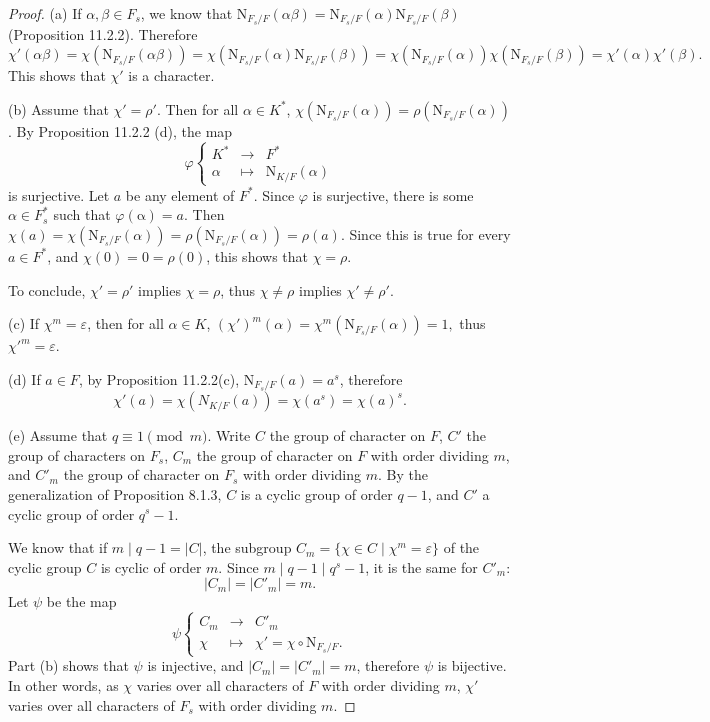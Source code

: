 \documentclass[11pt,a4paper]{article}
\begin{document}
\begin{proof}
\item[(a)] If $\alpha,\beta \in F_s$, we know that $\mathrm{N}_{F_s/F}(\alpha \beta) = \mathrm{N}_{F_s/F}(\alpha) \mathrm{N}_{F_s/F}(\beta)$ (Proposition 11.2.2). Therefore
$$\chi'(\alpha \beta) =\chi(\mathrm{N}_{F_s/F}(\alpha \beta)) =  \chi(\mathrm{N}_{F_s/F}(\alpha) \mathrm{N}_{F_s/F}(\beta)) = \chi(\mathrm{N}_{F_s/F}(\alpha))\chi(\mathrm{N}_{F_s/F}(\beta)) = \chi'(\alpha) \chi'(\beta).$$
This shows that $\chi'$ is a character.

\item[(b)] Assume that $\chi' = \rho'$. Then for all $\alpha \in K^*$, $\chi(\mathrm{N}_{F_s/F}(\alpha)) =\rho(\mathrm{N}_{F_s/F}(\alpha))$.
By Proposition 11.2.2 (d), the map
$$\varphi
\left\{
\begin{array}{ccl}
K^* & \to & F^*\\
\alpha & \mapsto & \mathrm{N}_{K/F}(\alpha)
\end{array}
\right.
$$
is surjective. Let $a$ be any element of $F^*$. Since $\varphi$ is surjective, there is some $\alpha \in F_s^*$ such that $\varphi (\mathrm{\alpha}) = a$.
Then $\chi(a) = \chi(\mathrm{N}_{F_s/F}(\alpha)) =\rho(\mathrm{N}_{F_s/F}(\alpha)) = \rho(a)$. Since this is true for every $a \in F^*$, and $\chi(0) = 0 = \rho(0)$, this shows that $\chi = \rho$. 

To conclude, $\chi' = \rho'$ implies $\chi = \rho$, thus $\chi \ne \rho$ implies $\chi' \ne \rho'$.

\item[(c)] If $\chi^m = \varepsilon$, then for all $\alpha \in K$, 
$(\chi')^m(\alpha) = \chi^m(\mathrm{N}_{F_s/F}(\alpha)) = 1,$
thus $\chi'^m = \varepsilon$.

\item[(d)] If $a \in F$, by Proposition 11.2.2(c), $\mathrm{N}_{F_s/F}(a) = a^s$, therefore
$$
\chi'(a) = \chi(N_{K/F}(a))= \chi(a^s)= \chi(a)^s.
$$

\item[(e)] Assume that $q \equiv 1 \pmod m$. Write $C$ the group of character on $F$, $C'$ the group of characters on $F_s$, $C_m$ the group of character on $F$ with order dividing $m$, and $C'_m$ the group of character on $F_s$ with order dividing $m$. By the generalization of Proposition 8.1.3, $C$ is a cyclic group of order $q-1$, and $C'$ a cyclic group of order $q^s -1$. 

We know that if $m \mid q-1 = |C|$, the subgroup $C_ m = \{\chi \in C \mid \chi^m = \varepsilon\}$ of the cyclic group $C$ is cyclic of order $m$. Since $m \mid q- 1 \mid q^s - 1$, it is the same for $C'_m$:
$$|C_m |= |C'_m| = m.$$
Let $\psi$ be the map
$$
\psi
\left\{
\begin{array}{ccl}
C_m & \to & C'_m\\
\chi & \mapsto & \chi' =  \chi \circ \mathrm{N}_{F_s/F}.
\end{array}
\right.
$$
Part (b) shows that $\psi$ is injective, and $|C_m| = |C'_m| = m$, therefore $\psi$ is bijective. In other words, as $\chi$ varies over all characters of $F$ with order dividing $m$, $\chi'$ varies over all characters of $F_s$ with order dividing $m$. 
\end{proof}
\end{document}
